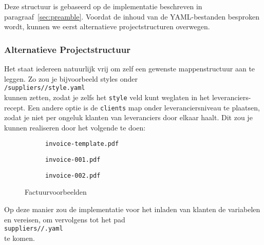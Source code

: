 
Deze structuur is gebaseerd op de implementatie beschreven in paragraaf~\ref{sec:preamble}.
Voordat de inhoud van de YAML-bestanden besproken wordt, kunnen we eerst alternatieve projectstructuren overwegen.


\subsubsection{Alternatieve Projectstructuur}
Het staat iedereen natuurlijk vrij om zelf een gewenste mappenstructuur aan te leggen.
Zo zou je bijvoorbeeld styles onder\\
\hspace*{4em}\texttt{/suppliers//style.yaml}\\[5pt]
kunnen zetten, zodat je zelfs het \texttt{style} veld kunt weglaten in het leveranciers-recept.
Een andere optie is de \texttt{clients} map onder leveranciersniveau te plaatsen, zodat je niet per ongeluk klanten van leveranciers door elkaar haalt.
Dit zou je kunnen realiseren door het volgende te doen:


\begin{figure*}[ht]
    \begin{subfigure}{.32\linewidth}
        \caption{\texttt{invoice-template.pdf}}\label{fig:result alt}
    \end{subfigure}\hfill
    \begin{subfigure}{.32\linewidth}
        \caption{\texttt{invoice-001.pdf}}\label{fig:result 1}
    \end{subfigure}\hfill
    \begin{subfigure}{.32\linewidth}
        \caption{\texttt{invoice-002.pdf}}\label{fig:result 2}
    \end{subfigure}
    \caption{Factuurvoorbeelden}\label{fig:pdfs}
\end{figure*}

\vspace*{11pt}

\newpage
\noindent
Op deze manier zou de implementatie voor het inladen van klanten de variabelen  en  vereisen, om vervolgens tot het pad\\[6pt]
\hspace*{4em}\texttt{suppliers//.yaml}\\[5pt]
te komen.


